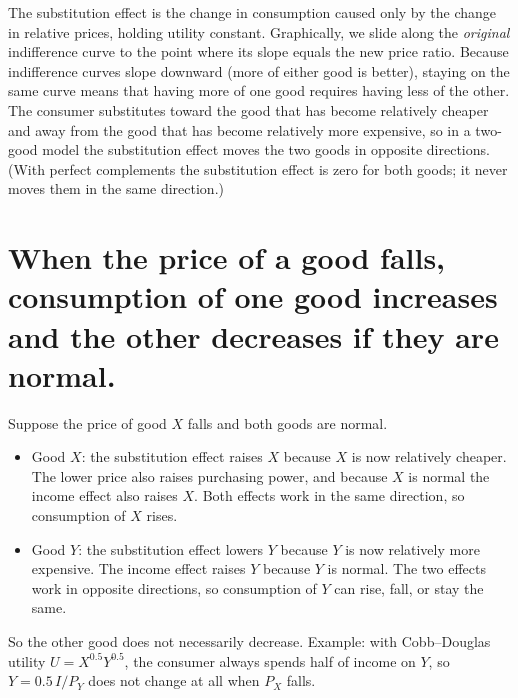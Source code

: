 \documentclass[11pt, a4]{exam}
\begin{document}
\begin{questions}
\begin{parts}
\begin{solution}[1in]
The substitution effect is the change in consumption caused only by the change in relative prices, holding utility constant. Graphically, we slide along the \emph{original} indifference curve to the point where its slope equals the new price ratio. Because indifference curves slope downward (more of either good is better), staying on the same curve means that having more of one good requires having less of the other. The consumer substitutes toward the good that has become relatively cheaper and away from the good that has become relatively more expensive, so in a two-good model the substitution effect moves the two goods in opposite directions. (With perfect complements the substitution effect is zero for both goods; it never moves them in the same direction.)
\end{solution}

\bigskip

\bigskip

\bigskip

\bigskip

\bigskip

\bigskip

\bigskip

\bigskip

\bigskip

\bigskip

\bigskip

\bigskip

\bigskip

\bigskip

\bigskip

\bigskip

\bigskip


\part[5] {When the price of a good falls, consumption of one good increases and the other decreases if they are normal.}  \answerline[False]

\begin{solution}[1in]
Suppose the price of good $X$ falls and both goods are normal.
\begin{itemize}
\item Good $X$: the substitution effect raises $X$ because $X$ is now relatively cheaper. The lower price also raises purchasing power, and because $X$ is normal the income effect also raises $X$. Both effects work in the same direction, so consumption of $X$ rises.
\item Good $Y$: the substitution effect lowers $Y$ because $Y$ is now relatively more expensive. The income effect raises $Y$ because $Y$ is normal. The two effects work in opposite directions, so consumption of $Y$ can rise, fall, or stay the same.
\end{itemize}
So the other good does not necessarily decrease. Example: with Cobb--Douglas utility $U = X^{0.5}Y^{0.5}$, the consumer always spends half of income on $Y$, so $Y = 0.5\,I/P_Y$ does not change at all when $P_X$ falls.
\end{solution}



\end{parts}
\end{questions}
\end{document}

